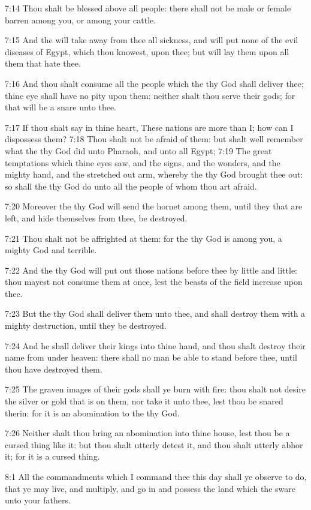 7:14 Thou shalt be blessed above all people: there shall not be male
or female barren among you, or among your cattle.

7:15 And the \LORD will take away from thee all sickness, and will put
none of the evil diseases of Egypt, which thou knowest, upon thee; but
will lay them upon all them that hate thee.

7:16 And thou shalt consume all the people which the \LORD thy God
shall deliver thee; thine eye shall have no pity upon them: neither
shalt thou serve their gods; for that will be a snare unto thee.

7:17 If thou shalt say in thine heart, These nations are more than I;
how can I dispossess them?  7:18 Thou shalt not be afraid of them: but
shalt well remember what the \LORD thy God did unto Pharaoh, and unto
all Egypt; 7:19 The great temptations which thine eyes saw, and the
signs, and the wonders, and the mighty hand, and the stretched out
arm, whereby the \LORD thy God brought thee out: so shall the \LORD thy
God do unto all the people of whom thou art afraid.

7:20 Moreover the \LORD thy God will send the hornet among them, until
they that are left, and hide themselves from thee, be destroyed.

7:21 Thou shalt not be affrighted at them: for the \LORD thy God is
among you, a mighty God and terrible.

7:22 And the \LORD thy God will put out those nations before thee by
little and little: thou mayest not consume them at once, lest the
beasts of the field increase upon thee.

7:23 But the \LORD thy God shall deliver them unto thee, and shall
destroy them with a mighty destruction, until they be destroyed.

7:24 And he shall deliver their kings into thine hand, and thou shalt
destroy their name from under heaven: there shall no man be able to
stand before thee, until thou have destroyed them.

7:25 The graven images of their gods shall ye burn with fire: thou
shalt not desire the silver or gold that is on them, nor take it unto
thee, lest thou be snared therin: for it is an abomination to the \LORD
thy God.

7:26 Neither shalt thou bring an abomination into thine house, lest
thou be a cursed thing like it: but thou shalt utterly detest it, and
thou shalt utterly abhor it; for it is a cursed thing.

8:1 All the commandments which I command thee this day shall ye
observe to do, that ye may live, and multiply, and go in and possess
the land which the \LORD sware unto your fathers.

